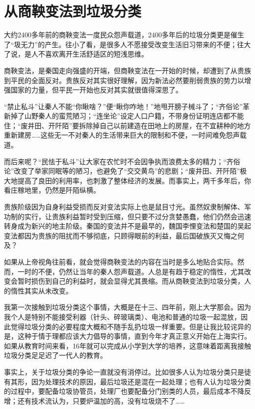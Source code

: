 \documentclass[
]{book}
\begin{document}
\hypertarget{ux4eceux5546ux9785ux53d8ux6cd5ux5230ux5783ux573eux5206ux7c7b}{%
\section{从商鞅变法到垃圾分类}\label{ux4eceux5546ux9785ux53d8ux6cd5ux5230ux5783ux573eux5206ux7c7b}}

大约2400多年前的商鞅变法一度民众怨声载道，2400多年后的垃圾分类更是催生了``圾无力''的产生。往小了看，是很多人不愿接受改变生活旧习带来的不便；往大了说，是人不喜欢离开生活舒适区的短浅思维。

商鞅变法，是秦国走向强盛的开端，但商鞅变法在一开始的时候，却遭到了从贵族到平民的全面反对。贵族反对其实很好理解，因为新法必然要削弱贵族的势力以增强国家的力量，但平民一开始也反对其实就很值得深思了。

``禁止私斗''让秦人不能``你瞅啥？''便``瞅你咋地！''地甩开膀子械斗了；``齐俗论''革新掉了山野秦人的蛮荒陋习；``连坐论''设定人口户籍，不带身份证明连店都不能住；``废井田、开阡陌''要拆除掉自己以前建造在田地上的房屋，在不宜耕种的地方重新建房\ldots\ldots 这些无一不对秦人的生活带来巨大的限制和不便，一时间难免怨声载道。

而后来呢？``民怯于私斗''让大家在农忙时不会因争执而浪费太多的精力；``齐俗论''改变了举家同眠等的陋习，也避免了``交交黄鸟''的悲剧；``废井田、开阡陌''极大地提高了良田的利用率，也刺激了整体经济的发展。而事实上，两千多年后，你看庄稼地里，仍然是阡陌纵横。

贵族阶级因为自身利益受损而反对变法实际上也是鼠目寸光。虽然奴隶制解体、军功制的实行，让贵族利益暂时受到压缩，但只要不过分贪婪愚蠢，他们仍然会迅速转身成为新兴的地主阶级。秦国的变法并不是最早的，魏国李悝变法和楚国的吴起变法都因为贵族的阻扰而不够彻底，只顾得眼前的利益，最后国破族灭又悔之何及？

如果从上帝视角往前看，就会觉得商鞅变法的内容在当时是多么地贴合实际。然而，一时的不便，仍然让当年的秦人怨声载道。人总是有趋于稳定的惰性，尤其改变会暂时损伤到自己的利益时，就会显得尤其畏缩。而从商鞅变法到垃圾分类，人的惰性其实从未改变。

我第一次接触到垃圾分类这个事情，大概是在十三、四年前，刚上大学那会。因为我个人是特别不能接受利器（针头、碎玻璃类）、电池和普通的垃圾一起混放，因此觉得垃圾分类的必要程度大概和不随手乱扔垃圾一样重要。但是让我比较诧异的是，这种于情于理都应该大力倡导的事情，直到今年才真正意义开始在上海实行。如果从教育时间来看，16年就可以完成从小学到大学的培养，这意味着距离我接触垃圾分类足足迟了一代人的教育。

事实上，关于垃圾分类的争论一直就没有消停过。比如很多人认为垃圾分类只是徒有其形，因为处理技术的原因，最后垃圾还是混在一起处理；也有人认为垃圾分类的过程中，要配备垃圾协管员，处理厂也要配备分门别类的人员，最后成本不降反增；还有技术流认为，只要炉温加的高，没有垃圾烧不了\ldots\ldots{}
\end{document}
